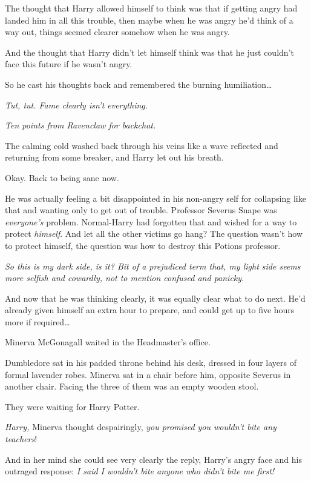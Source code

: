 The thought that Harry allowed himself to think was that if getting angry had landed him in all this trouble, then maybe when he was angry he'd think of a way out, things seemed clearer somehow when he was angry.

And the thought that Harry didn't let himself think was that he just couldn't face this future if he wasn't angry.

So he cast his thoughts back and remembered the burning humiliation…

\emph{Tut, tut. Fame clearly isn't everything.}

\emph{Ten points from Ravenclaw for backchat.}

The calming cold washed back through his veins like a wave reflected and returning from some breaker, and Harry let out his breath.

Okay. Back to being sane now.

He was actually feeling a bit disappointed in his non-angry self for collapsing like that and wanting only to get out of trouble. Professor Severus Snape was \emph{everyone's} problem. Normal-Harry had forgotten that and wished for a way to protect \emph{himself}. And let all the other victims go hang? The question wasn't how to protect himself, the question was how to destroy this Potions professor.

\emph{So this is my dark side, is it? Bit of a prejudiced term that, my light side seems more selfish and cowardly, not to mention confused and panicky.}

And now that he was thinking clearly, it was equally clear what to do next. He'd already given himself an extra hour to prepare, and could get up to five hours more if required…

\later

Minerva McGonagall waited in the Headmaster's office.

Dumbledore sat in his padded throne behind his desk, dressed in four layers of formal lavender robes. Minerva sat in a chair before him, opposite Severus in another chair. Facing the three of them was an empty wooden stool.

They were waiting for Harry Potter.

\emph{Harry,} Minerva thought despairingly, \emph{you promised you wouldn't bite any teachers}!

And in her mind she could see very clearly the reply, Harry's angry face and his outraged response: \emph{I said I wouldn't bite anyone who didn't bite me first!}

